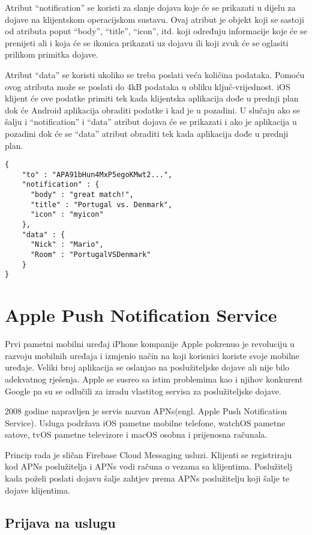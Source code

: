 \documentclass[times, utf8, zavrsni]{fer}
\begin{document}
Atribut ``notification'' se koristi za slanje dojava koje će se prikazati u dijelu za dojave na klijentskom operacijskom sustavu. Ovaj atribut je objekt koji se sastoji od atributa poput ``body'', ``title'', ``icon'', itd. koji određuju informacije koje će se prenijeti ali i koja će se ikonica prikazati uz dojavu ili koji zvuk će se oglasiti prilikom primitka dojave.

Atribut ``data'' se koristi ukoliko se treba poslati veća količina podataka. Pomoću ovog atributa može se poslati do 4kB podataka u obliku ključ-vrijednost. iOS klijent će ove podatke primiti tek kada klijentska aplikacija dođe u prednji plan dok će Android aplikacija obraditi podatke i kad je u pozadini. U slučaju ako se šalju i ``notification'' i ``data'' atribut dojava će se prikazati i ako je aplikacija u pozadini dok će se ``data'' atribut obraditi tek kada aplikacija dođe u prednji plan.

\begin{lstlisting}
{
    "to" : "APA91bHun4MxP5egoKMwt2...",
    "notification" : {
      "body" : "great match!",
      "title" : "Portugal vs. Denmark",
      "icon" : "myicon"
    },
    "data" : {
      "Nick" : "Mario",
      "Room" : "PortugalVSDenmark"
    }
}
\end{lstlisting}

\section{Apple Push Notification Service}

Prvi pametni mobilni uređaj iPhone kompanije Apple pokrenuo je revoluciju u razvoju mobilnih uređaja i izmjenio način na koji korisnici koriste svoje mobilne uređaje. Veliki broj aplikacija se oslanjao na poslužiteljske dojave ali nije bilo adekvatnog rješenja. Apple se susreo sa istim problemima kao i njihov konkurent Google pa su se odlučili za izradu vlastitog servisa za poslužiteljske dojave.

2008 godine napravljen je servis nazvan APNs(engl. Apple Push Notification Service). Usluga podržava iOS pametne mobilne telefone, watchOS pametne satove, tvOS pametne televizore i macOS osobna i prijenosna računala.

Princip rada je sličan Firebase Cloud Messaging usluzi. Klijenti se registriraju kod APNs poslužitelja i APNs vodi računa o vezama sa klijentima. Poslužitelj kada poželi poslati dojavu šalje zahtjev prema APNs poslužitelju koji šalje te dojave klijentima.

\subsection{Prijava na uslugu}
\end{document}
